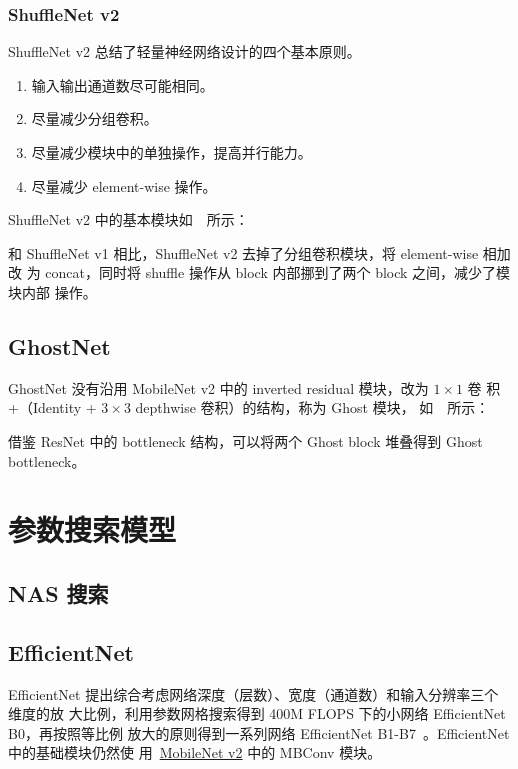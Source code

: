 \subsection{ShuffleNet v2}
ShuffleNet v2 总结了轻量神经网络设计的四个基本原则。

\begin{enumerate}
  \item 输入输出通道数尽可能相同。
  \item 尽量减少分组卷积。
  \item 尽量减少模块中的单独操作，提高并行能力。
  \item 尽量减少 element-wise 操作。
\end{enumerate}

ShuffleNet v2 中的基本模块如~~所示：

和 ShuffleNet v1 相比，ShuffleNet v2 去掉了分组卷积模块，将 element-wise 相加改
为 concat，同时将 shuffle 操作从 block 内部挪到了两个 block 之间，减少了模块内部
操作。

\section{GhostNet}
GhostNet 没有沿用 MobileNet v2 中的 inverted residual 模块，改为 $1 \times 1$ 卷
积 +（Identity + $3 \times 3$ depthwise 卷积）的结构，称为 Ghost 模块，
如~~所示：

借鉴 ResNet 中的 bottleneck 结构，可以将两个 Ghost block 堆叠得到 Ghost
bottleneck。

\chapter{参数搜索模型}

\section{NAS 搜索}

\section{EfficientNet}
EfficientNet 提出综合考虑网络深度（层数）、宽度（通道数）和输入分辨率三个维度的放
大比例，利用参数网格搜索得到 400M FLOPS 下的小网络 EfficientNet B0，再按照等比例
放大的原则得到一系列网络 EfficientNet
B1-B7~\cite{2019-EfficientNet}。EfficientNet 中的基础模块仍然使
用~\hyperref[subsec:MobileNet-v2]{MobileNet v2} 中的 MBConv 模块。

